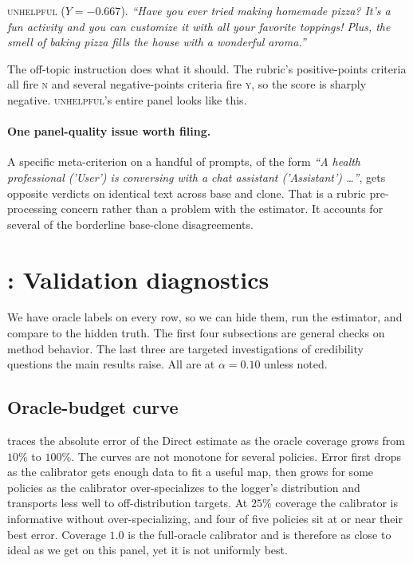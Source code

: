 \documentclass[11pt]{article}
\begin{document}
\textsc{unhelpful} ($Y = -0.667$). \emph{``Have you ever tried making
homemade pizza? It's a fun activity and you can customize it with all
your favorite toppings! Plus, the smell of baking pizza fills the
house with a wonderful aroma.''}

The off-topic instruction does what it should. The rubric's
positive-points criteria all fire \textsc{n} and several
negative-points criteria fire \textsc{y}, so the score is sharply
negative. \textsc{unhelpful}'s entire panel looks like this.

\paragraph{One panel-quality issue worth filing.}
A specific meta-criterion on a handful of prompts, of the form
\emph{``A health professional ('User') is conversing with a chat
assistant ('Assistant') \ldots ''}, gets opposite verdicts on identical
text across base and clone. That is a rubric pre-processing concern
rather than a problem with the estimator. It accounts for several of
the borderline base-clone disagreements.

\section{: Validation diagnostics}
\label{app:diagnostics}

We have oracle labels on every row, so we can hide them, run the
estimator, and compare to the hidden truth. The first four
subsections are general checks on method behavior. The last three are
targeted investigations of credibility questions the main results
raise. All are at $\alpha = 0.10$ unless noted.

\subsection{Oracle-budget curve}
\label{app:budget}

 traces the absolute error of the Direct estimate as
the oracle coverage grows from $10\%$ to $100\%$. The curves are not
monotone for several policies. Error first drops as the calibrator
gets enough data to fit a useful map, then grows for some policies as
the calibrator over-specializes to the logger's distribution and
transports less well to off-distribution targets. At $25\%$ coverage
the calibrator is informative without over-specializing, and four of
five policies sit at or near their best error. Coverage $1.0$ is the
full-oracle calibrator and is therefore as close to ideal as we get
on this panel, yet it is not uniformly best.
\end{document}
